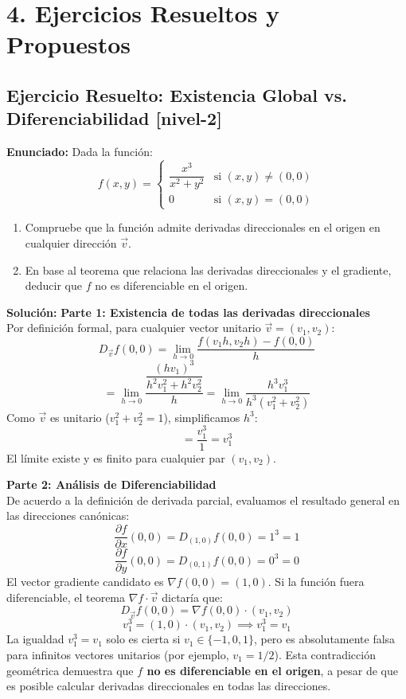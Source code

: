 \documentclass[11pt]{article}
\newenvironment{ejercicios}{%
  \section*{4. Ejercicios Resueltos y Propuestos}%
}{}
\newenvironment{ejercicioresuelto}[2]{\subsection*{Ejercicio Resuelto: #1 \small{[#2]}}}{}
\newcommand{\enunciado}[1]{\textbf{Enunciado:} #1\par\vspace{0.2cm}}
\newcommand{\solucion}[1]{\textbf{Solución:} #1\par\vspace{0.4cm}}
\begin{document}
\begin{ejercicios}
  \begin{ejercicioresuelto}{Existencia Global vs. Diferenciabilidad}{nivel-2}
    \enunciado{
      Dada la función:
      $$ f(x,y) = \begin{cases} \dfrac{x^3}{x^2 + y^2} & \text{si } (x,y) \neq (0,0) \\[1em] 0 & \text{si } (x,y) = (0,0) \end{cases} $$
      \begin{enumerate}
        \item Compruebe que la función admite derivadas direccionales en el origen en cualquier dirección $\vec{v}$.
        \item En base al teorema que relaciona las derivadas direccionales y el gradiente, deducir que $f$ no es diferenciable en el origen.
      \end{enumerate}
    }
    \solucion{
      \textbf{Parte 1: Existencia de todas las derivadas direccionales} \\
      Por definición formal, para cualquier vector unitario $\vec{v} = (v_1, v_2)$:
      $$ D_{\vec{v}} f(0,0) = \lim\limits_{h \to 0} \dfrac{f(v_1 h, v_2 h) - f(0,0)}{h} $$
      $$ = \lim\limits_{h \to 0} \dfrac{\dfrac{(h v_1)^3}{h^2 v_1^2 + h^2 v_2^2}}{h} = \lim\limits_{h \to 0} \dfrac{h^3 v_1^3}{h^3(v_1^2 + v_2^2)} $$
      Como $\vec{v}$ es unitario ($v_1^2 + v_2^2 = 1$), simplificamos $h^3$:
      $$ = \dfrac{v_1^3}{1} = v_1^3 $$
      El límite existe y es finito para cualquier par $(v_1, v_2)$.

      \textbf{Parte 2: Análisis de Diferenciabilidad} \\
      De acuerdo a la definición de derivada parcial, evaluamos el resultado general en las direcciones canónicas:
      $$ \dfrac{\partial f}{\partial x}(0,0) = D_{(1,0)} f(0,0) = 1^3 = 1 $$
      $$ \dfrac{\partial f}{\partial y}(0,0) = D_{(0,1)} f(0,0) = 0^3 = 0 $$
      El vector gradiente candidato es $\nabla f(0,0) = (1,0)$.
      Si la función fuera diferenciable, el teorema $\nabla f \cdot \vec{v}$ dictaría que:
      $$ D_{\vec{v}} f(0,0) = \nabla f(0,0) \cdot (v_1, v_2) $$
      $$ v_1^3 = (1,0) \cdot (v_1, v_2) \implies v_1^3 = v_1 $$
      La igualdad $v_1^3 = v_1$ solo es cierta si $v_1 \in \{-1, 0, 1\}$, pero es absolutamente falsa para infinitos vectores unitarios (por ejemplo, $v_1 = 1/2$).
      Esta contradicción geométrica demuestra que \textbf{$f$ no es diferenciable en el origen}, a pesar de que es posible calcular derivadas direccionales en todas las direcciones.
    }
  \end{ejercicioresuelto}


\end{ejercicios}
\end{document}
